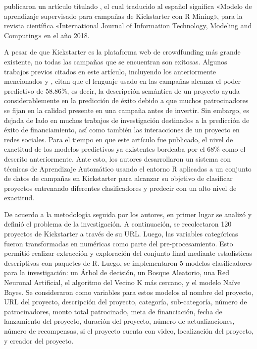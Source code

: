 \cite{pr_kamath2018suplearn} publicaron un artículo titulado , el cual traducido al español significa «Modelo de aprendizaje supervisado para campañas de Kickstarter con R Mining», para la revista científica «International Journal of Information Technology, Modeling and Computing» en el año 2018.

A pesar de que Kickstarter es la plataforma web de crowdfunding más grande existente, no todas las campañas que se encuentran son exitosas. Algunos trabajos previos citados en este artículo, incluyendo los anteriormente mencionados \cite{pr_chen2013kickpredict} y \cite{pr_mitra2014phrases}, citan que el lenguaje usado en las campañas alcanza el poder predictivo de 58.86\%, es decir, la descripción semántica de un proyecto ayuda considerablemente en la predicción de éxito debido a que muchos patrocinadores se fijan en la calidad presente en una campaña antes de invertir.  Sin embargo, es dejada de lado en muchos trabajos de investigación destinados a la predicción de éxito de financiamiento, así como también las interacciones de un proyecto en redes sociales. Para el tiempo en que este artículo fue publicado, el nivel de exactitud de los modelos predictivos ya existentes bordeaba por el 68\% como el descrito anteriormente. Ante esto, los autores desarrollaron un sistema con técnicas de Aprendizaje Automático usando el entorno R aplicadas a un conjunto de datos de campañas en Kickstarter para alcanzar su objetivo de clasificar proyectos entrenando diferentes clasificadores y predecir con un alto nivel de exactitud.

De acuerdo a la metodología seguida por los autores, en primer lugar se analizó y definió el problema de la investigación. A continuación, se recolectaron 120 proyectos de Kickstarter a través de su URL. Luego, las variables categóricas fueron transformadas en numéricas como parte del pre-procesamiento. Esto permitió realizar extracción y exploración del conjunto final mediante estadísticas descriptivas con paquetes de R. Luego, se implementaron 5 modelos clasificadores para la investigación: un Árbol de decisión, un Bosque Aleatorio, una Red Neuronal Artificial, el algoritmo del Vecino K más cercano, y el modelo Naïve Bayes. Se consideraron como variables para estos modelos al nombre del proyecto, URL del proyecto, descripción del proyecto, categoría, sub-categoría, número de patrocinadores, monto total patrocinado, meta de financiación, fecha de lanzamiento del proyecto, duración del proyecto, número de actualizaciones, número de recompensas, si el proyecto cuenta con video, localización del proyecto, y creador del proyecto.

